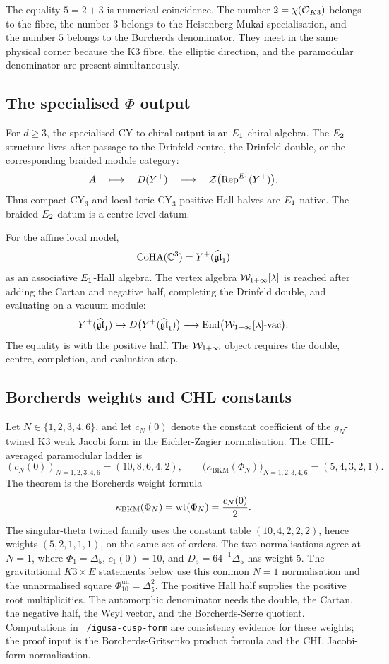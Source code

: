 The equality \(5=2+3\) is numerical coincidence. The number
\(2=\chi(\mathcal{O}_{K3})\) belongs to the fibre, the number \(3\) belongs to
the Heisenberg-Mukai specialisation, and the number \(5\) belongs to
the Borcherds denominator. They meet in the same physical corner
because the K3 fibre, the elliptic direction, and the paramodular
denominator are present simultaneously.

\subsection*{The specialised \texorpdfstring{$\Phi$}{Phi} output}

For \(d\geq 3\), the specialised CY-to-chiral output is an \(E_1\)
chiral algebra. The \(E_2\) structure lives after passage to the
Drinfeld centre, the Drinfeld double, or the corresponding braided
module category:
\[
A\quad\longmapsto\quad
D(Y^+)\quad\longmapsto\quad
\mathcal Z\bigl(\mathrm{Rep}^{E_1}(Y^+)\bigr).
\]
Thus compact CY\(_3\) and local toric CY\(_3\) positive Hall halves are
\(E_1\)-native. The braided \(E_2\) datum is a centre-level datum.

For the affine local model,
\[
\mathrm{CoHA}(\mathbb{C}^3)=Y^+(\widehat{\mathfrak{gl}}_1)
\]
as an associative \(E_1\)-Hall algebra. The vertex algebra
\(\mathcal{W}_{1+\infty}[\lambda]\) is reached after adding the Cartan and
negative half, completing the Drinfeld double, and evaluating on a
vacuum module:
\[
Y^+(\widehat{\mathfrak{gl}}_1)
\hookrightarrow
D\bigl(Y^+(\widehat{\mathfrak{gl}}_1)\bigr)
\longrightarrow
\mathrm{End}\bigl(\mathcal{W}_{1+\infty}[\lambda]\text{-}\mathrm{vac}\bigr).
\]
The equality is with the positive half. The \(\mathcal{W}_{1+\infty}\) object
requires the double, centre, completion, and evaluation step.

\subsection*{Borcherds weights and CHL constants}

Let \(N\in\{1,2,3,4,6\}\), and let \(c_N(0)\) denote the constant
coefficient of the \(g_N\)-twined K3 weak Jacobi form in the
Eichler-Zagier normalisation. The CHL-averaged paramodular ladder is
\[
(c_N(0))_{N=1,2,3,4,6}=(10,8,6,4,2),
\qquad
\bigl(\kappa_{\mathrm{BKM}}(\Phi_N)\bigr)_{N=1,2,3,4,6}
=(5,4,3,2,1).
\]
The theorem is the Borcherds weight formula
\[
\kappa_{\mathrm{BKM}}(\Phi_N)=\mathrm{wt}(\Phi_N)=\frac{c_N(0)}{2}.
\]
The singular-theta twined family uses the constant table
\((10,4,2,2,2)\), hence weights \((5,2,1,1,1)\), on the same set of
orders. The two normalisations agree at \(N=1\), where
\(\Phi_1=\Delta_5\), \(c_1(0)=10\), and \(D_5=64^{-1}\Delta_5\) has
weight \(5\). The gravitational \(K3\times E\) statements below use
this common \(N=1\) normalisation and the unnormalised square
\(\Phi_{10}^{\mathrm{un}}=\Delta_5^2\).
The positive Hall half supplies the positive root multiplicities. The
automorphic denominator needs the double, the Cartan, the negative
half, the Weyl vector, and the Borcherds-Serre quotient. Computations
in \texttt{\string~/igusa-cusp-form} are consistency evidence for
these weights; the proof input is the Borcherds-Gritsenko product
formula and the CHL Jacobi-form normalisation.

